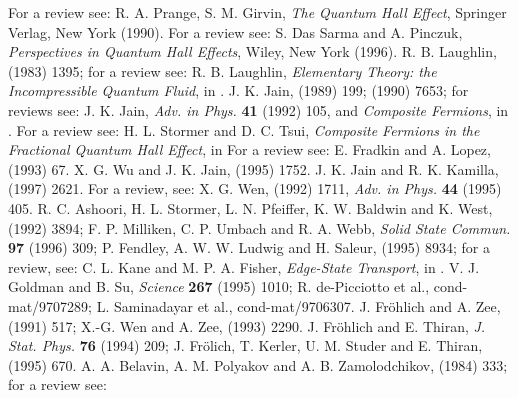 \begin{references}
 For a review see: R. A. Prange, S. M. Girvin, 
                {\it The Quantum Hall Effect}, Springer Verlag, 
                New York (1990).
 For a review see: S. Das Sarma and A. Pinczuk,
                {\it Perspectives in Quantum Hall Effects}, Wiley,
                New York (1996).
 R. B. Laughlin,  (1983) 1395;
                for a review see: R. B. Laughlin, {\it Elementary Theory: the
                Incompressible Quantum Fluid}, in \cite{prange}.
  J. K. Jain,  (1989) 199;  (1990)
                7653; for reviews see: J. K. Jain, {\it Adv. in Phys.} 
                {\bf 41} (1992) 105, and 
                {\it Composite Fermions}, in \cite{dspin}. 
 For a review see: H. L. Stormer and D. C. Tsui, 
                {\it Composite Fermions in
                the Fractional Quantum Hall Effect}, in \cite{dspin}
  For a review see: E. Fradkin and A. Lopez, 
                 (1993) 67.
    X. G. Wu and J. K. Jain,  (1995) 1752.
  J. K. Jain and R. K. Kamilla,  (1997) 2621.
   For a review, see: X. G. Wen,  (1992) 1711,
                {\it Adv. in Phys.} {\bf 44} (1995) 405.
  R. C. Ashoori, H. L. Stormer, L. N. Pfeiffer, K. W. Baldwin
                and K. West,  (1992) 3894;
  F. P. Milliken, C. P. Umbach and R. A. Webb, 
                {\it Solid State Commun.} {\bf 97} (1996) 309;
                P. Fendley, A. W. W. Ludwig and
                H. Saleur,  (1995) 8934;
                for a review, see: C. L. Kane and M. P. A. Fisher,
                {\it Edge-State Transport}, in \cite{dspin}.
  V. J. Goldman and B. Su, {\it Science} {\bf 267} (1995)
                1010; R. de-Picciotto et al., cond-mat/9707289;
                L. Saminadayar et al., cond-mat/9706307.
 J. Fr\"ohlich and A. Zee,  (1991) 517; 
                X.-G. Wen and A. Zee,  (1993) 2290.
                J. Fr\"ohlich and E. Thiran, {\it J. Stat. Phys.}
                {\bf 76} (1994) 209; J. Fr\"olich, T. Kerler, U. M. Studer 
                and E. Thiran,  (1995) 670.
  A. A. Belavin, A. M. Polyakov and A. B. Zamolodchikov,
                 (1984) 333; for a review see:

\end{references}
